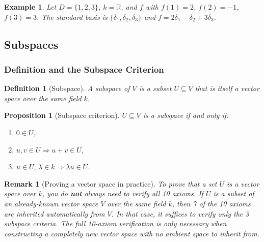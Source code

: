 \documentclass{article}
\newtheorem{definition}{Definition}
\newtheorem*{example}{Example}
\newtheorem{remark}{Remark}
\newtheorem{proposition}{Proposition}
\begin{document}
\begin{example}
    Let $D=\{1,2,3\}$, $k=\mathbb{R}$, and $f$ with $f(1)=2$, $f(2)=-1$, $f(3)=3$. The standard basis is $\{\delta_1,\delta_2,\delta_3\}$ and $f = 2\delta_1 - \delta_2 + 3\delta_3$.
\end{example}

\subsection{Subspaces}

\subsubsection{Definition and the Subspace Criterion}
\begin{definition}[Subspace]
    A subspace of $V$ is a subset $U \subseteq V$ that is itself a vector space over the same field $k$.
\end{definition}
\begin{proposition}[Subspace criterion]
    $U \subseteq V$ is a subspace if and only if:
    \begin{enumerate}
        \item $0 \in U$,
        \item $u,v \in U \Rightarrow u+v \in U$,
        \item $u \in U,\,\lambda \in k \Rightarrow \lambda u \in U$.
    \end{enumerate}
\end{proposition}
\begin{remark}[Proving a vector space in practice]
    To prove that a set $U$ is a vector space over $k$, you do \textbf{not} always need to verify all 10 axioms. If $U$ is a subset of an already-known vector space $V$ over the same field $k$, then 7 of the 10 axioms are \emph{inherited automatically} from $V$. In that case, it suffices to verify only the 3 subspace criteria. The full 10-axiom verification is only necessary when constructing a completely new vector space with no ambient space to inherit from.
\end{remark}
\end{document}
